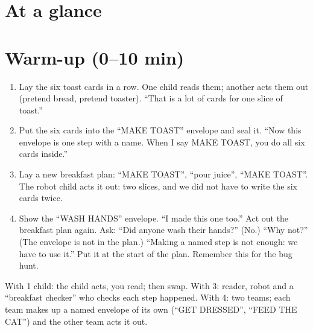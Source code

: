 \section{At a glance}
\begin{timeplan}
\end{timeplan}

\section{Warm-up (0--10 min)}
\begin{unplugged}
\begin{enumerate}[leftmargin=1.4em,itemsep=1pt]
  \item Lay the six toast cards in a row. One child reads them; another acts them out (pretend bread, pretend toaster). \enquote{That is a lot of cards for one slice of toast.}
  \item Put the six cards into the \enquote{MAKE TOAST} envelope and seal it. \enquote{Now this envelope is one step with a name. When I say MAKE TOAST, you do all six cards inside.}
  \item Lay a new breakfast plan: \enquote{MAKE TOAST}, \enquote{pour juice}, \enquote{MAKE TOAST}. The robot child acts it out: two slices, and we did not have to write the six cards twice.
  \item Show the \enquote{WASH HANDS} envelope. \enquote{I made this one too.} Act out the breakfast plan again. Ask: \enquote{Did anyone wash their hands?} (No.) \enquote{Why not?} (The envelope is not in the plan.) \enquote{Making a named step is not enough: we have to use it.} Put it at the start of the plan. Remember this for the bug hunt.
\end{enumerate}
With 1 child: the child acts, you read; then swap. With 3: reader, robot and a \enquote{breakfast checker} who checks each step happened. With 4: two teams; each team makes up a named envelope of its own (\enquote{GET DRESSED}, \enquote{FEED THE CAT}) and the other team acts it out.
\end{unplugged}

